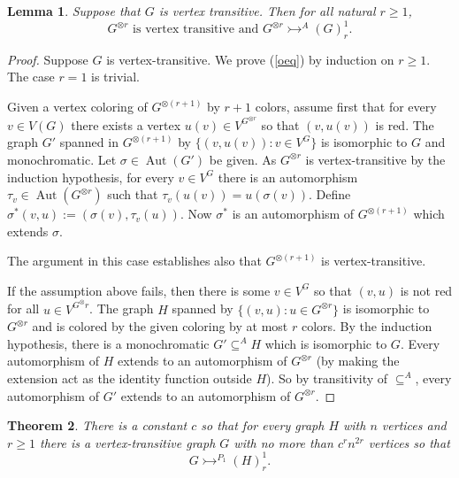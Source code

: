 \documentclass[11pt]{amsart}
\newcommand{\ars}{\rightarrowtail}
\newcommand{\su}{\subseteq}
\newcommand{\aut}{\operatorname{Aut}}
\newtheorem{theorem}{Theorem}[section]
\newtheorem{lemma}[theorem]{Lemma}
\begin{document}
\begin{lemma} \label{otimes} Suppose that $G$ is vertex transitive.
Then
 for all natural $r\ge 1$,
\begin{equation}\label{oeq}
G^{\otimes r} \text{ is vertex
 transitive and } G^{\otimes r}\ars ^A (G)^1_r.
\end{equation}
\end{lemma}
\begin{proof}
  Suppose $G$ is vertex-transitive. We prove (\ref{oeq}) by induction
  on $r\ge 1$. The case $r=1$ is trivial.


  Given a vertex coloring of $G^{\otimes (r+1)}$ by $r+1$ colors,
  assume first that for every $v\in V(G)$ there exists a vertex
  $u(v)\in V^{G^{\otimes r}}$ so that $(v,u(v))$ is red. The graph
  $G'$ spanned in $G^{\otimes (r+1)}$ by $\{(v,u(v)):v\in V^G\}$ is
  isomorphic to $G$ and monochromatic. Let $\sigma\in \aut(G')$ be
  given. As $G^{\otimes r}$ is vertex-transitive by the induction
  hypothesis, for every $v\in V^G$ there is an automorphism $\tau_v\in
  \aut(G^{\otimes r})$ such that $\tau_v(u(v))=u(\sigma(v))$. Define
  $\sigma^*(v,u):=(\sigma(v), \tau_v(u))$. Now $\sigma^*$ is an
  automorphism of $G^{\otimes(r+1)}$ which extends $\sigma$.

  The argument in this case establishes also that $G^{\otimes(r+1)}$
  is vertex-transitive.


  If the assumption above fails, then there is some $v\in V^G$ so that
  $(v,u)$ is not red for all $u\in V^{G^\otimes r}$. The graph $H$
  spanned by $\{(v,u):u\in G^{\otimes r}\}$ is isomorphic to
  $G^{\otimes r}$ and is colored by the given coloring by at most $r$
  colors. By the induction hypothesis, there is a monochromatic
  $G'\su^A H$ which is isomorphic to $G$. Every automorphism of $H$
  extends to an automorphism of $G^{\otimes r}$ (by making the
  extension act as the identity function outside $H$).
  So by
  transitivity of $\su^A$, every automorphism of $G'$ extends to an
  automorphism of $G^{\otimes r}$.
\end{proof}


\begin{theorem}\label{P1}
  There is a constant $c$ so that for every graph $H$ with $n$
  vertices and $r\ge 1$ there is a vertex-transitive graph $G$ with no
  more than $c^rn^{2r}$ vertices so that
\[G\ars^{P_1}(H)^1_r.\]
\end{theorem}
\end{document}
